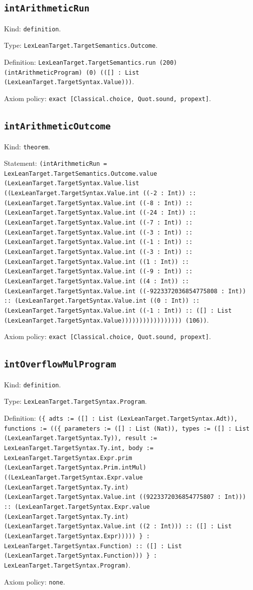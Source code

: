 \documentclass[11pt]{article}
\begin{document}
\subsection*{\texttt{intArithmeticRun}}
\noindent Kind: \texttt{definition}.\par
\noindent Type: \texttt{LexLeanTarget.TargetSemantics.Outcome}.\par
\noindent Definition: \texttt{LexLeanTarget.TargetSemantics.run (200) (intArithmeticProgram) (0) (([] : List (LexLeanTarget.TargetSyntax.Value)))}.\par
\noindent Axiom policy: \texttt{exact [Classical.choice, Quot.sound, propext]}.\par
\subsection*{\texttt{intArithmeticOutcome}}
\noindent Kind: \texttt{theorem}.\par
\noindent Statement: \texttt{(intArithmeticRun = LexLeanTarget.TargetSemantics.Outcome.value (LexLeanTarget.TargetSyntax.Value.list ((LexLeanTarget.TargetSyntax.Value.int ((-2 : Int)) :: (LexLeanTarget.TargetSyntax.Value.int ((-8 : Int)) :: (LexLeanTarget.TargetSyntax.Value.int ((-24 : Int)) :: (LexLeanTarget.TargetSyntax.Value.int ((-7 : Int)) :: (LexLeanTarget.TargetSyntax.Value.int ((-3 : Int)) :: (LexLeanTarget.TargetSyntax.Value.int ((-1 : Int)) :: (LexLeanTarget.TargetSyntax.Value.int ((-3 : Int)) :: (LexLeanTarget.TargetSyntax.Value.int ((1 : Int)) :: (LexLeanTarget.TargetSyntax.Value.int ((-9 : Int)) :: (LexLeanTarget.TargetSyntax.Value.int ((4 : Int)) :: (LexLeanTarget.TargetSyntax.Value.int ((-9223372036854775808 : Int)) :: (LexLeanTarget.TargetSyntax.Value.int ((0 : Int)) :: (LexLeanTarget.TargetSyntax.Value.int ((-1 : Int)) :: ([] : List (LexLeanTarget.TargetSyntax.Value))))))))))))))))) (106))}.\par
\noindent Axiom policy: \texttt{exact [Classical.choice, Quot.sound, propext]}.\par
\subsection*{\texttt{intOverflowMulProgram}}
\noindent Kind: \texttt{definition}.\par
\noindent Type: \texttt{LexLeanTarget.TargetSyntax.Program}.\par
\noindent Definition: \texttt{(\{ adts := ([] : List (LexLeanTarget.TargetSyntax.Adt)), functions := ((\{ parameters := ([] : List (Nat)), types := ([] : List (LexLeanTarget.TargetSyntax.Ty)), result := LexLeanTarget.TargetSyntax.Ty.int, body := LexLeanTarget.TargetSyntax.Expr.prim (LexLeanTarget.TargetSyntax.Prim.intMul) ((LexLeanTarget.TargetSyntax.Expr.value (LexLeanTarget.TargetSyntax.Ty.int) (LexLeanTarget.TargetSyntax.Value.int ((9223372036854775807 : Int))) :: (LexLeanTarget.TargetSyntax.Expr.value (LexLeanTarget.TargetSyntax.Ty.int) (LexLeanTarget.TargetSyntax.Value.int ((2 : Int))) :: ([] : List (LexLeanTarget.TargetSyntax.Expr))))) \} : LexLeanTarget.TargetSyntax.Function) :: ([] : List (LexLeanTarget.TargetSyntax.Function))) \} : LexLeanTarget.TargetSyntax.Program)}.\par
\noindent Axiom policy: \texttt{none}.\par
\end{document}
